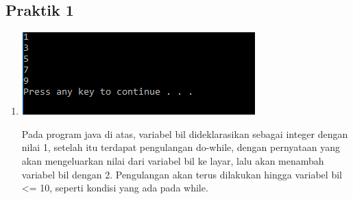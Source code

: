 \documentclass[a4paper,12pt]{article}
\begin{document}
\subsection{Praktik 1}
\begin{enumerate}
	 

\item \begin{minipage}[t]{\linewidth}
	\raggedright
\begin{center}
	\includegraphics[scale=1]{Capture1_2}
\end{center}


    \end{minipage}
Pada program java di atas, variabel bil dideklarasikan sebagai integer dengan nilai 1, setelah itu terdapat pengulangan do-while, dengan pernyataan yang akan mengeluarkan nilai dari variabel bil ke layar, lalu akan menambah variabel bil dengan 2. Pengulangan akan terus dilakukan hingga variabel bil <= 10, seperti kondisi yang ada pada while.


\end{enumerate}
\end{document}
